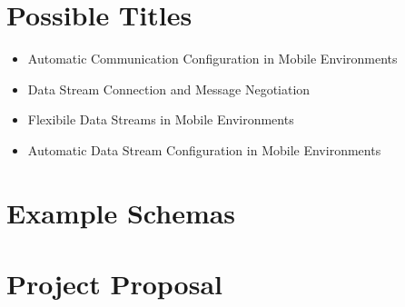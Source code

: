 \documentclass[12pt,twoside,notitlepage]{report}
\begin{document}
\cleardoublepage


\nocite{*}

\cleardoublepage

\appendix

\chapter{Possible Titles}

\begin{itemize}
\item Automatic Communication Configuration in Mobile Environments
\item Data Stream Connection and Message Negotiation
\item Flexibile Data Streams in Mobile Environments
\item Automatic Data Stream Configuration in Mobile Environments
\end{itemize}

\cleardoublepage

\chapter{Example Schemas}



\cleardoublepage

\chapter{Project Proposal}


\end{document}
